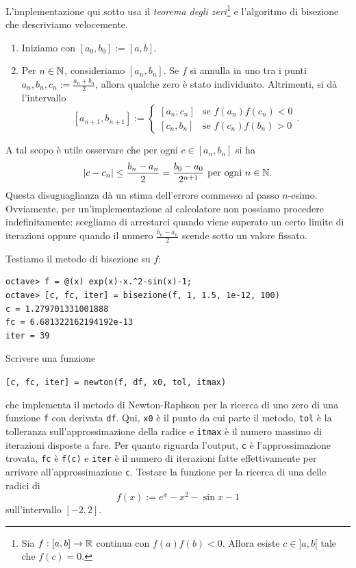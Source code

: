 L'implementazione qui sotto usa il {\em teorema degli zeri}\footnote{Sia \(f : [a, b] \to \mathbb R\) continua con \(f(a)f(b) < 0\). Allora esiste \(c \in ]a, b[\) tale che \(f(c) = 0\).} e l'algoritmo di bisezione che descriviamo velocemente.
\begin{enumerate}
\item Iniziamo con \([a_0, b_0] := [a, b]\).
\item Per \(n \in \mathbb N\), consideriamo \([a_n, b_n]\). Se \(f\) si annulla in uno tra i punti \(a_n, b_n, c_n := \frac{a_n+b_n}{2}\), allora qualche zero è stato individuato. Altrimenti, si dà l'intervallo
\[[a_{n+1}, b_{n+1}] := \begin{cases} [a_n, c_n] & \text{se } f(a_n)f(c_n) < 0 \\ [c_n, b_n] & \text{se } f(c_n)f(b_n) > 0 \end{cases}.\]
\end{enumerate}
A tal scopo è utile osservare che per ogni \(c \in [a_n, b_n]\) si ha
\[\lvert c-c_n \rvert \le \frac{b_n - a_n}{2} = \frac{b_0 - a_0}{2^{n+1}} \text{ per ogni } n \in \mathbb N .\]
Questa disuguaglianza dà un stima dell'errore commesso al passo \(n\)-esimo. Ovviamente, per un'implementazione al calcolatore non possiamo procedere indefinitamente: scegliamo di arrestarci quando viene superato un certo limite di iterazioni oppure quando il numero \(\frac{b_n - a_n}{2}\) scende sotto un valore fissato.



Testiamo il metodo di bisezione su \(f\):

\begin{lstlisting}[numbers=none]
octave> f = @(x) exp(x)-x.^2-sin(x)-1;
octave> [c, fc, iter] = bisezione(f, 1, 1.5, 1e-12, 100)
c = 1.279701331001888
fc = 6.681322162194192e-13
iter = 39
\end{lstlisting}


\begin{esercizio}
Scrivere una funzione
\begin{center}
\lstinline£[c, fc, iter] = newton(f, df, x0, tol, itmax)£
\end{center}
che implementa il metodo di \textenglish{Newton-Raphson} per la ricerca di uno zero di una funzione \lstinline£f£ con derivata \lstinline£df£. Qui, \lstinline£x0£ è il punto da cui parte il metodo, \lstinline£tol£ è la tolleranza sull'approssimazione della radice e \lstinline£itmax£ è il numero massimo di iterazioni disposte a fare. Per quanto riguarda l'output, \lstinline£c£ è l'approssimazione trovata, \lstinline£fc£ è \lstinline£f(c)£ e \lstinline£iter£ è il numero di iterazioni fatte effettivamente per arrivare all'approssimazione \lstinline£c£. Testare la funzione per la ricerca di una delle radici di
\[f(x) := e^x - x^2 - \sin x - 1\]
sull'intervallo \([-2, 2]\).
\end{esercizio}

